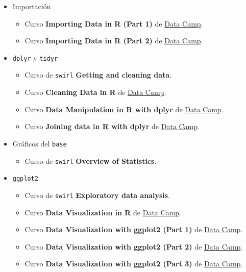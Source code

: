 \documentclass[]{article}
\providecommand{\tightlist}{%
  \setlength{\itemsep}{0pt}\setlength{\parskip}{0pt}}
\begin{document}
\begin{itemize}
\tightlist
\item
  Importación

  \begin{itemize}
  \tightlist
  \item
    Curso \textbf{Importing Data in R (Part 1)} de
    \href{https://www.datacamp.com/courses/importing-data-in-r-part-1}{Data
    Camp}.
  \item
    Curso \textbf{Importing Data in R (Part 2)} de
    \href{https://www.datacamp.com/courses/importing-data-in-r-part-2}{Data
    Camp}.
  \end{itemize}
\item
  \texttt{dplyr} y \texttt{tidyr}

  \begin{itemize}
  \tightlist
  \item
    Curso de \texttt{swirl} \textbf{Getting and cleaning data}.
  \item
    Curso \textbf{Cleaning Data in R} de
    \href{https://www.datacamp.com/courses/cleaning-data-in-r}{Data
    Camp}.
  \item
    Curso \textbf{Data Manipulation in R with dplyr} de
    \href{https://www.datacamp.com/courses/dplyr-data-manipulation-r-tutorial}{Data
    Camp}.
  \item
    Curso \textbf{Joining data in R with dplyr} de
    \href{https://www.datacamp.com/courses/joining-data-in-r-with-dplyr}{Data
    Camp}.
  \end{itemize}
\item
  Gráficos del \texttt{base}

  \begin{itemize}
  \tightlist
  \item
    Curso de \texttt{swirl} \textbf{Overview of Statistics}.
  \end{itemize}
\item
  \texttt{ggplot2}

  \begin{itemize}
  \tightlist
  \item
    Curso de \texttt{swirl} \textbf{Exploratory data analysis}.
  \item
    Curso \textbf{Data Visualization in R} de
    \href{https://www.datacamp.com/courses/data-visualization-in-r}{Data
    Camp}.
  \item
    Curso \textbf{Data Visualization with ggplot2 (Part 1)} de
    \href{https://www.datacamp.com/courses/data-visualization-with-ggplot2-1}{Data
    Camp}.
  \item
    Curso \textbf{Data Visualization with ggplot2 (Part 2)} de
    \href{https://www.datacamp.com/courses/data-visualization-with-ggplot2-2}{Data
    Camp}.
  \item
    Curso \textbf{Data Visualization with ggplot2 (Part 3)} de
    \href{https://www.datacamp.com/courses/data-visualization-with-ggplot2-3}{Data
    Camp}.
  \end{itemize}
\end{itemize}
\end{document}
